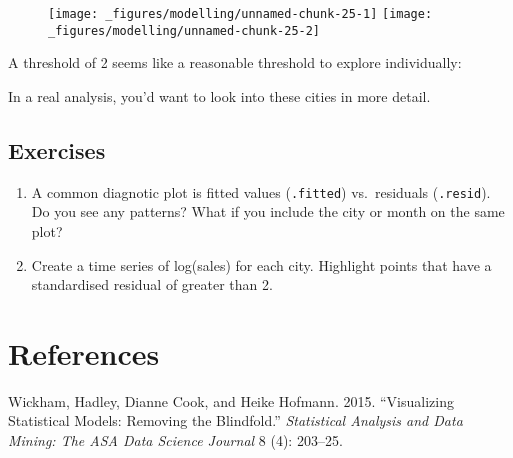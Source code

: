 \begin{figure}[H]
  \texttt{[image: \_figures/modelling/unnamed-chunk-25-1]}%
  \texttt{[image: \_figures/modelling/unnamed-chunk-25-2]}
\end{figure}

A threshold of 2 seems like a reasonable threshold to explore
individually:

\begin{Shaded}
\end{Shaded}

In a real analysis, you'd want to look into these cities in more detail.

\subsection{Exercises}

\begin{enumerate}
\def\labelenumi{\arabic{enumi}.}
\item
  A common diagnotic plot is fitted values (\texttt{.fitted})
  vs.~residuals (\texttt{.resid}). Do you see any patterns? What if you
  include the city or month on the same plot?
\item
  Create a time series of log(sales) for each city. Highlight points
  that have a standardised residual of greater than 2.
\end{enumerate}

\section*{References}

Wickham, Hadley, Dianne Cook, and Heike Hofmann. 2015. ``Visualizing
Statistical Models: Removing the Blindfold.'' \emph{Statistical Analysis
and Data Mining: The ASA Data Science Journal} 8 (4): 203--25.
